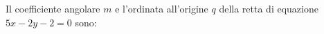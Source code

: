 Il coefficiente angolare \(\displaystyle m\) e l'ordinata all'origine \(\displaystyle q\) della retta 
di equazione \(\displaystyle 5x-2y-2=0\) sono: